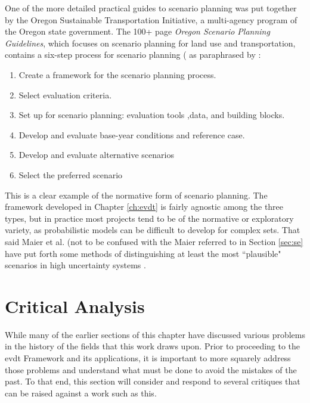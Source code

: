 One of the more detailed practical guides to scenario planning was put together by the Oregon Sustainable Transportation Initiative, a multi-agency program of the Oregon state government. The 100+ page \textit{Oregon Scenario Planning Guidelines}, which focuses on scenario planning for land use and transportation, contains a six-step process for scenario planning ( \cite{oregonsustainabletransportationinitiativeScenarioPlanningGuidelines2017} as paraphrased by \cite{goodspeedScenarioPlanningCities2020}:

\begin{enumerate}[itemsep=0pt,parsep=0pt]
	\item{Create a framework for the scenario planning process.}
	\item{Select evaluation criteria.}
	\item{Set up for scenario planning: evaluation tools ,data, and building blocks.}
	\item{Develop and evaluate base-year conditions and reference case.}
	\item{Develop and evaluate alternative scenarios}
	\item{Select the preferred scenario}
\end{enumerate}

This is a clear example of the normative form of scenario planning. The framework developed in Chapter \ref{ch:evdt} is fairly agnostic among the three types, but in practice most projects tend to be of the normative or exploratory variety, as probabilistic models can be difficult to develop for complex \acf{sets}. That said Maier et al. (not to be confused with the Maier referred to in Section \ref{sec:se} have put forth some methods of distinguishing at least the most ``plausible" scenarios in high uncertainty systems \cite{maierUncertainFutureDeep2016}.

\section{Critical Analysis} \label{sec:critiques}

While many of the earlier sections of this chapter have discussed various problems in the history of the fields that this work draws upon. Prior to proceeding to the \ac{evdt} Framework and its applications, it is important to more squarely address those problems and understand what must be done to avoid the mistakes of the past. To that end, this section will consider and respond to several critiques that can be raised against a work such as this.

